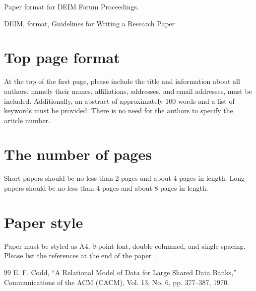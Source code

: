 \documentclass{deime}
\begin{document}
\pagestyle{empty}

\begin{eabstract}
Paper format for DEIM Forum Proceedings.
\end{eabstract}

\begin{ekeyword}
DEIM, format, Guidelines for Writing a Research Paper
\end{ekeyword}

\maketitle

\section{Top page format}

At the top of the first page, please include the title and information about all authors, namely their names, affiliations, addresses, and email addresses, must be included. 
Additionally, an abstract of approximately 100 words and a list of keywords must be provided. 
There is no need for the authors to specify the article number.

\section{The number of pages}

Short papers should be no less than 2 pages and about 4 pages in length. 
Long papers should be no less than 4 pages and about 8 pages in length.

\section{Paper style}

Paper must be styled as A4, 9-point font, double-columned, and single spacing. 
Please list the references at the end of the paper~\cite{Codd1970}.


\vspace{2em}

\begin{thebibliography}{99}
  E. F. Codd, 
  ``A Relational Model of Data for Large Shared Data Banks,''
  Communications of the {ACM} (CACM), Vol. 13, No. 6, pp. 377--387, 1970.
\end{thebibliography}

% 
% 
\end{document}

